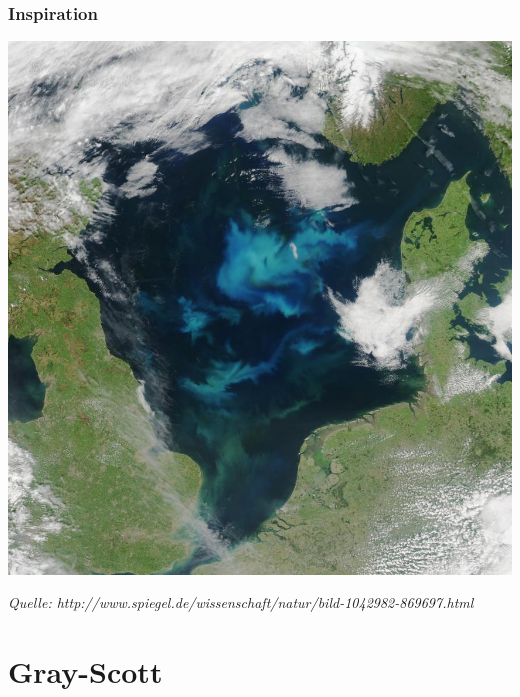 \documentclass[12pt]{beamer}
\begin{document}
    \begin{frame}
    \begin{center}
    \frametitle{Inspiration}
    \includegraphics[scale=0.15]{Bilder/seaweed.jpg}
    
    {\tiny \textit{Quelle: http://www.spiegel.de/wissenschaft/natur/bild-1042982-869697.html}}
    \end{center}
    \end{frame}
    

    \section{Gray-Scott}
    
\end{document}
